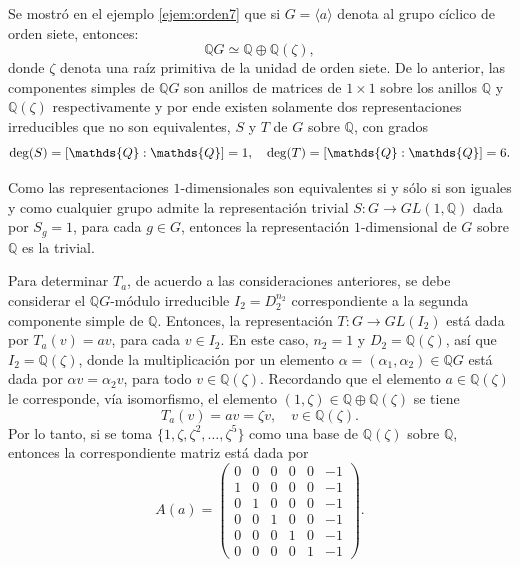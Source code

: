  \begin{ejemplo}
 Se mostró  en el ejemplo \ref{ejem:orden7} que si $G = \langle a \rangle$ denota al grupo cíclico de orden siete, entonces:
 \begin{equation*} \mathds{Q}G \simeq \mathds{Q}\oplus\mathds{Q}(\zeta), \end{equation*} donde $\zeta$ denota una raíz primitiva de la unidad de orden siete. De lo anterior, las componentes simples de $\mathds{Q}G$ son anillos de matrices de $1\times 1$ sobre los anillos $\mathds{Q}$ y $\mathds{Q}(\zeta)$ respectivamente y por ende existen solamente dos representaciones irreducibles que no son equivalentes, $S$ y $T$ de $G$ sobre $\mathds{Q}$, con grados
 \begin{equation*} \grado(S) = [\mathds{Q}:\mathds{Q}] = 1, \quad \grado(T) = [\mathds{Q}:\mathds{Q}] = 6. \end{equation*} 
 
 Como las representaciones $1\mbox{-dimensionales}$ son equivalentes si y sólo si son iguales y como cualquier grupo admite la representación trivial $S \colon G \to GL(1,\mathds{Q})$ dada por $S_g = 1$, para cada $g \in G$, entonces la representación $1\mbox{-dimensional}$ de $G$ sobre $\mathds{Q}$ es la trivial.
 
 Para determinar $T_a$, de acuerdo a las consideraciones anteriores, se debe considerar el $\mathds{Q}G\mbox{-módulo}$ irreducible $I_2 = D_2^{n_2}$ correspondiente a la segunda componente simple de $\mathds{Q}$. Entonces, la representación $T \colon G \to GL(I_2)$ está dada por $T_a(v) = av$, para cada $v \in I_2$. En este caso, $n_2 = 1$ y $D_2 = \mathds{Q}(\zeta)$, así que $I_2 = \mathds{Q}(\zeta)$, donde la multiplicación por un elemento $\alpha = (\alpha_1, \alpha_2) \in \mathds{Q}G$ está dada por $\alpha v = \alpha_2v$, para todo $v \in \mathds{Q}(\zeta)$. Recordando que el elemento $a \in \mathds{Q}(\zeta)$ le corresponde, vía isomorfismo, el elemento $(1,\zeta) \in \mathds{Q}\oplus\mathds{Q}(\zeta)$ se tiene
 \begin{equation*} T_a(v) = av = \zeta v, \quad v 
 \in \mathds{Q}(\zeta). \end{equation*} Por lo tanto, si se toma $\{ 1, \zeta, \zeta^2, \dots, \zeta^5 \}$ como una base de $\mathds{Q}(\zeta)$ sobre $\mathds{Q}$, entonces la correspondiente matriz está dada por
 \begin{equation*} A(a) = \begin{pmatrix}
 0 & 0 & 0 & 0 & 0 & -1 \\
 1 & 0 & 0 & 0 & 0 & -1 \\
 0 & 1 & 0 & 0 & 0 & -1 \\
 0 & 0 & 1 & 0 & 0 & -1 \\
 0 & 0 & 0 & 1 & 0 & -1 \\
 0 & 0 & 0 & 0 & 1 & -1
 \end{pmatrix}. \end{equation*}
 \end{ejemplo}
